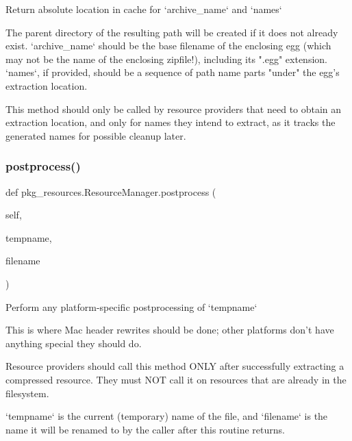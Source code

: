 \begin{DoxyVerb}Return absolute location in cache for `archive_name` and `names`

The parent directory of the resulting path will be created if it does
not already exist.  `archive_name` should be the base filename of the
enclosing egg (which may not be the name of the enclosing zipfile!),
including its ".egg" extension.  `names`, if provided, should be a
sequence of path name parts "under" the egg's extraction location.

This method should only be called by resource providers that need to
obtain an extraction location, and only for names they intend to
extract, as it tracks the generated names for possible cleanup later.
\end{DoxyVerb}
 \mbox{\label{classpkg__resources_1_1_resource_manager_af459cd9904c680589c54e462b0e6cf4d}} 
\subsubsection{\texorpdfstring{postprocess()}{postprocess()}}
{\footnotesize\ttfamily def pkg\+\_\+resources.\+Resource\+Manager.\+postprocess (\begin{DoxyParamCaption}\item[{}]{self,  }\item[{}]{tempname,  }\item[{}]{filename }\end{DoxyParamCaption})}

\begin{DoxyVerb}Perform any platform-specific postprocessing of `tempname`

This is where Mac header rewrites should be done; other platforms don't
have anything special they should do.

Resource providers should call this method ONLY after successfully
extracting a compressed resource.  They must NOT call it on resources
that are already in the filesystem.

`tempname` is the current (temporary) name of the file, and `filename`
is the name it will be renamed to by the caller after this routine
returns.
\end{DoxyVerb}
 \mbox{\label{classpkg__resources_1_1_resource_manager_ad1b6e05f2dbd4022e832ce0fce52a49c}} 
